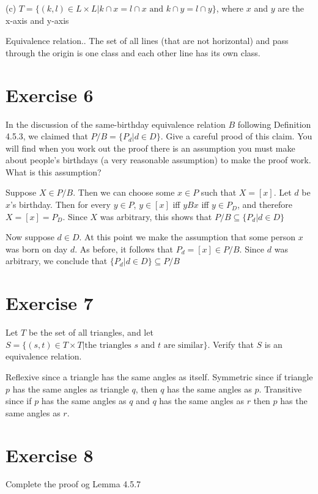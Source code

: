 \documentclass[11pt]{article}
\begin{document}
\noindent (c) $T = \{(k,l) \in L \times L | k \cap x = l \cap x \text{ and } k \cap y = l \cap y\}$,
where $x$ and $y$ are the x-axis and y-axis 

Equivalence relation.. The set of all lines (that are not horizontal) and pass 
through the origin is one class and each other line has its own class.

\section*{Exercise 6}

In the discussion of the same-birthday equivalence relation $B$ following 
Definition 4.5.3, we claimed that $P/B = \{P_d | d \in D\}$. 
Give a careful prood of this claim. You will find when you work out the 
proof there is an assumption you must make about people's birthdays 
(a very reasonable assumption) to make the proof work. What is this 
assumption?

Suppose $X \in P/B$. Then we can choose some $x \in P$ such that $X = [x]$.
Let $d$ be $x$'s birthday. Then for every $y \in P$, $y \in [x]$ iff $yBx$
iff $y \in P_D$, and therefore $X = [x] = P_D$. Since $X$ was arbitrary, this 
shows that $P/B \subseteq \{P_d | d \in D\}$

Now suppose $d \in D$. At this point we make the assumption that some person $x$ 
was born on day $d$. As before, it follows that $P_d = [x] \in P/B$. Since $d$
was arbitrary, we conclude that $\{P_d | d \in D\} \subseteq P/B$

\section*{Exercise 7}

Let $T$ be the set of all triangles, and let 
$S = \{(s,t) \in T \times T | \text{the triangles } s \text{ and } t \text{ are similar}\}$.
Verify that $S$ is an equivalence relation.

Reflexive since a triangle has the same angles as itself. Symmetric since if 
triangle $p$ has the same angles as triangle $q$, then $q$ has the same angles 
as $p$. Transitive since if $p$ has the same angles as $q$ and $q$ has the 
same angles as $r$ then $p$ has the same angles as $r$.

\section*{Exercise 8}

Complete the proof og Lemma 4.5.7
\end{document}
